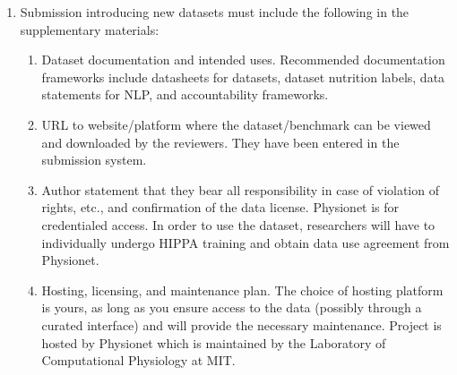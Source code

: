 \begin{enumerate}

\item Submission introducing new datasets must include the following in the supplementary materials: \answerYes{}
\begin{enumerate}
  \item Dataset documentation and intended uses. Recommended documentation frameworks include datasheets for datasets, dataset nutrition labels, data statements for NLP, and accountability frameworks.
  \item URL to website/platform where the dataset/benchmark can be viewed and downloaded by the reviewers. \answerYes{} They have been entered in the submission system.
  \item Author statement that they bear all responsibility in case of violation of rights, etc., and confirmation of the data license. \answerNA{} Physionet is for credentialed access. In order to use the dataset, researchers will have to individually undergo HIPPA training and obtain data use agreement from Physionet.
  \item Hosting, licensing, and maintenance plan. The choice of hosting platform is yours, as long as you ensure access to the data (possibly through a curated interface) and will provide the necessary maintenance. \answerYes{} Project is hosted by Physionet which is maintained by the Laboratory of Computational Physiology at MIT.
\end{enumerate}


\end{enumerate}
